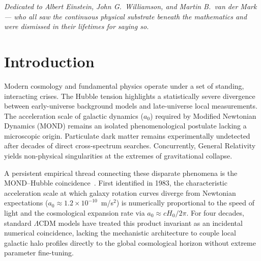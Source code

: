 \documentclass[aps,prd,twocolumn,superscriptaddress,amsmath,amssymb,nofootinbib,floatfix]{revtex4-2}
\begin{document}
\maketitle

\begin{center}
\emph{Dedicated to Albert Einstein, John G.\ Williamson, and Martin B.\ van der Mark --- who all saw the continuous physical substrate beneath the mathematics and were dismissed in their lifetimes for saying so.}
\end{center}

\section{Introduction}
\label{sec:intro}

Modern cosmology and fundamental physics operate under a set of standing, interacting crises. The Hubble tension highlights a statistically severe divergence between early-universe background models and late-universe local measurements. The acceleration scale of galactic dynamics ($a_0$) required by Modified Newtonian Dynamics (MOND) remains an isolated phenomenological postulate lacking a microscopic origin. Particulate dark matter remains experimentally undetected after decades of direct cross-spectrum searches. Concurrently, General Relativity yields non-physical singularities at the extremes of gravitational collapse.

A persistent empirical thread connecting these disparate phenomena is the MOND--Hubble coincidence~\cite{Milgrom1983}. First identified in 1983, the characteristic acceleration scale at which galaxy rotation curves diverge from Newtonian expectations ($a_0 \approx 1.2 \times 10^{-10}$~m/s$^2$) is numerically proportional to the speed of light and the cosmological expansion rate via $a_0 \approx c H_0 / 2\pi$. For four decades, standard $\Lambda$CDM models have treated this product invariant as an incidental numerical coincidence, lacking the mechanistic architecture to couple local galactic halo profiles directly to the global cosmological horizon without extreme parameter fine-tuning.
\end{document}

